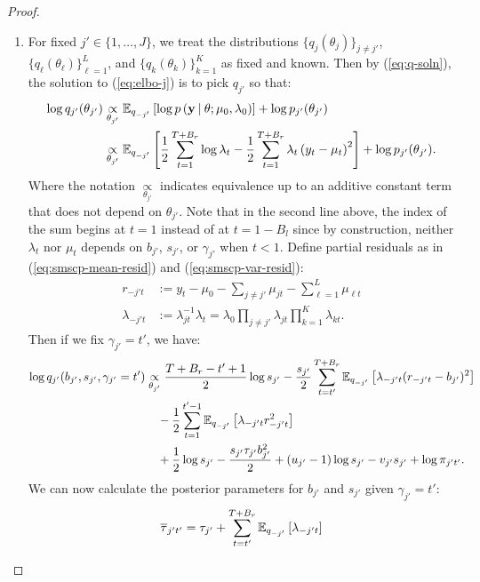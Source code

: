 \begin{proof}
\begin{enumerate}[label=\roman*.]
\item For fixed $j' \in\{1,\ldots,J\}$, we treat the distributions $\{q_j(\theta_j)\}_{j\neq j'}$, $\{q_\ell(\theta_\ell)\}_{\ell=1}^L$, and $\{q_k(\theta_k)\}_{k=1}^K$ as fixed and known. Then by (\ref{eq:q-soln}), the solution to (\ref{eq:elbo-j}) is to pick $q_{j'}$ so that:
\begin{align*}
    \log q_{j'}(\theta_{j'}) &\underset{\theta_{j'}}{\propto} \mathbb{E}_{q_{-j'}} \left[\log p\left(\mathbf{y} \:|\: \theta;\mu_0,\lambda_0\right)\right]  + \log p_{j'}(\theta_{j'}) \\
    &\underset{\theta_{j'}}{\propto}  \mathbb{E}_{q_{-j'}}\left[\frac{1}{2}\sum_{t=1}^{T+B_r} \log\lambda_t - \frac{1}{2}\sum_{t=1}^{T+B_r} \lambda_{t}\left(y_t - \mu_t\right)^2\right] + \log p_{j'}(\theta_{j'}).
\end{align*}
Where the notation $\underset{\theta_{j'}}{\propto}$ indicates equivalence up to an additive constant term that does not depend on $\theta_{j'}$. Note that in the second line above, the index of the sum begins at $t = 1$ instead of at $t = 1 - B_l$ since by construction, neither $\lambda_t$ nor $\mu_t$ depends on $b_{j'}$, $s_{j'}$, or $\gamma_{j'}$ when $t < 1$. Define partial residuals as in (\ref{eq:smscp-mean-resid}) and (\ref{eq:smscp-var-resid}):
\begin{align*}
    r_{-j't} &:= y_t - \mu_0 - \sum_{j\neq j'} \mu_{jt} - \sum_{\ell=1}^L \mu_{\ell t} \\
    \lambda_{-j't} &:= \lambda_{jt}^{-1}\lambda_t = \lambda_0\prod_{j \neq j'}\lambda_{jt} \prod_{k=1}^K \lambda_{kt}. 
\end{align*}
Then if we fix $\gamma_{j'} = t'$, we have:
\begin{align*}
     \log q_{j'}(b_{j'}, s_{j'}, \gamma_{j'} = t')&\underset{\theta_{j'}}{\propto} \frac{T + B_r - t' + 1}{2} \log s_{j'}  -\frac{s_{j'}}{2} \sum_{t=t'}^{T+B_r} \mathbb{E}_{q_{-j'}}\left[\lambda_{-j't}(r_{-j't} - b_{j'})^2\right] \\
    &\quad -\frac{1}{2} \sum_{t=1}^{t'-1} \mathbb{E}_{q_{-j'}}\left[\lambda_{-j't}r_{-j't}^2\right] \\
    &\quad + \frac{1}{2}\log s_{j'} - \frac{s_{j'}\tau_{j'}b_{j'}^2}{2} + (u_{j'}-1)\log s_{j'} - v_{j'}s_{j'} + \log \pi_{j't'}.  
\end{align*}
We can now calculate the posterior parameters for $b_{j'}$ and $s_{j'}$ given $\gamma_{j'} = t'$:
\begin{align*}
    \overline{\tau}_{j't'} &=  \tau_{j'} +  \sum_{t=t'}^{T+B_r} \E_{q_{-j'}}\left[\lambda_{-j't}\right] \\

\end{align*}
\end{enumerate}
\end{proof}

